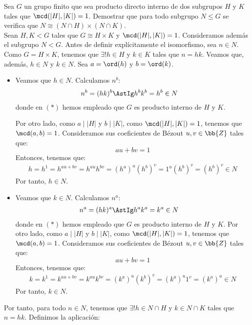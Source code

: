 \begin{ejercicio}
    Sea $G$ un grupo finito que sea producto directo interno de dos subgrupos $H$ y $K$ tales que $\mcd(|H|,|K|)=1$. Demostrar que para todo subgrupo $N\leq G$ se verifica que $N\cong (N\cap H)\times (N\cap K)$.\\

    
    Sean $H,K< G$ tales que $G\cong H\times K$ y $\mcd(|H|,|K|)=1$. Consideramos además el subgrupo $N<G$. Antes de definir explícitamente el isomorfismo, sea $n\in N$. Como $G=H\times K$, tenemos que $\exists! h\in H$ y $k\in K$ tales que $n=hk$. Veamos que, además, $h\in N$ y $k\in N$. Sea $a=\ord(h)$ y $b=\ord(k)$.
    \begin{itemize}
        \item Veamos que $h\in N$. Calculamos $n^{b}$:
        \begin{align*}
            n^{b} &= (hk)^{b} \AstIg h^{b}k^{b} = h^{b}\in N
        \end{align*}
        donde en $(\ast)$ hemos empleado que $G$ es producto interno de $H$ y $K$.

        Por otro lado, como $a\mid |H|$ y $b\mid |K|$, como $\mcd(|H|,|K|)=1$, tenemos que $\mcd(a,b)=1$. Consideramos sus coeficientes de Bézout $u,v\in \bb{Z}$ tales que:
        \begin{equation*}
            au+bv=1
        \end{equation*}
        Entonces, tenemos que:
        \begin{align*}
            h = h^1 = h^{au+bv} = h^{au}h^{bv} = (h^a)^u(h^b)^v = 1^u(h^b)^v = (h^b)^v \in N
        \end{align*}
        Por tanto, $h\in N$.

        \item Veamos que $k\in N$. Calculamos $n^{a}$:
        \begin{align*}
            n^{a} &= (hk)^{a} \AstIg h^{a}k^{a} = k^{a}\in N
        \end{align*}
        donde en $(\ast)$ hemos empleado que $G$ es producto interno de $H$ y $K$.
        Por otro lado, como $a\mid |H|$ y $b\mid |K|$, como $\mcd(|H|,|K|)=1$, tenemos que $\mcd(a,b)=1$. Consideramos sus coeficientes de Bézout $u,v\in \bb{Z}$ tales que:
        \begin{equation*}
            au+bv=1
        \end{equation*}
        Entonces, tenemos que:
        \begin{align*}
            k = k^1 = k^{au+bv} = k^{au}k^{bv} = (k^a)^u(k^b)^v = (k^a)^u1^v = (k^a)^u \in N
        \end{align*}
        Por tanto, $k\in N$.
    \end{itemize}
    Por tanto, para todo $n\in N$, tenemos que $\exists! h\in N\cap H$ y $k\in N\cap K$ tales que $n=hk$. Definimos la aplicación:


\end{ejercicio}
